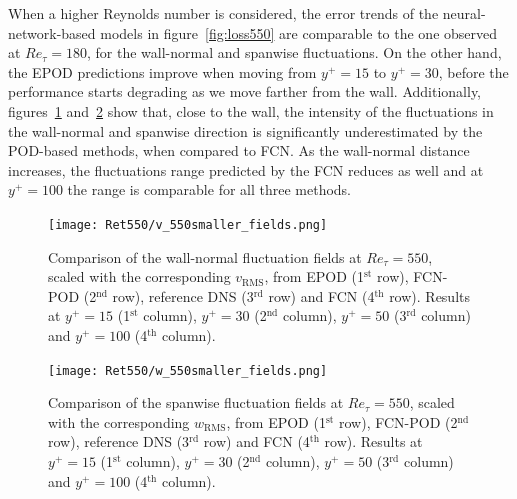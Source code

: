 When a higher Reynolds number is considered, the error trends of the neural-network-based models in figure~\ref{fig:loss550} are comparable to the one observed at $Re_{\tau}=180$, for the wall-normal and spanwise fluctuations.
On the other hand, the EPOD predictions improve when moving from $y^+=15$ to $y^+=30$, before the performance starts degrading as we move farther from the wall.
Additionally, figures~\ref{fig:field_comp550v} and~\ref{fig:field_comp550w} show that, close to the wall, the intensity of the fluctuations in the wall-normal and spanwise direction is significantly underestimated by the POD-based methods, when compared to FCN.
As the wall-normal distance increases, the fluctuations range predicted by the FCN reduces as well and at $y^+=100$ the range is comparable for all three methods.

\begin{figure}
\begin{center}
\texttt{[image: Ret550/v\_550smaller\_fields.png]}
\end{center}
\caption{\label{fig:field_comp550v} Comparison of the wall-normal fluctuation fields at $Re_{\tau} = 550$, scaled with the corresponding $v_\mathrm{RMS}$, from EPOD (1$^{\text{st}}$ row), FCN-POD (2$^{\text{nd}}$ row), reference DNS (3$^{\text{rd}}$ row) and FCN (4$^{\text{th}}$ row). Results at $y^+=15$ (1$^{\text{st}}$ column), $y^+=30$ (2$^{\text{nd}}$ column), $y^+=50$ (3$^{\text{rd}}$ column) and $y^+=100$ (4$^{\text{th}}$ column).}
\end{figure}

\begin{figure}
\begin{center}
% 
 \texttt{[image: Ret550/w\_550smaller\_fields.png]}
 \end{center}
\caption{\label{fig:field_comp550w} Comparison of the spanwise fluctuation  fields at $Re_{\tau} = 550$, scaled with the corresponding $w_\mathrm{RMS}$, from EPOD (1$^{\text{st}}$ row), FCN-POD (2$^{\text{nd}}$ row), reference DNS (3$^{\text{rd}}$ row) and FCN (4$^{\text{th}}$ row). Results at $y^+=15$ (1$^{\text{st}}$ column), $y^+=30$ (2$^{\text{nd}}$ column), $y^+=50$ (3$^{\text{rd}}$ column) and $y^+=100$ (4$^{\text{th}}$ column).}
\end{figure}


%
%
%
